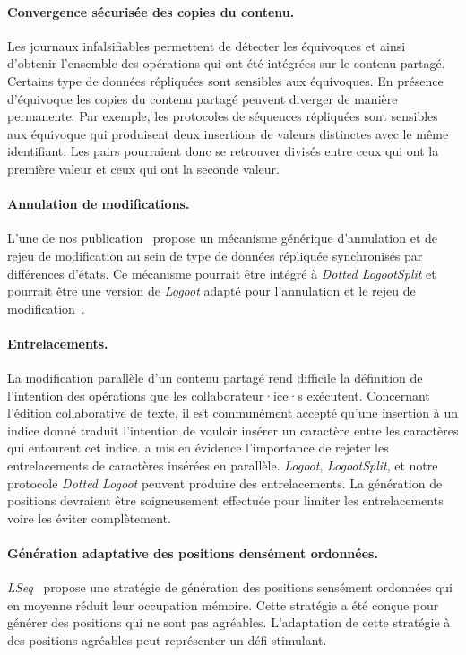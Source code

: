\paragraph{Convergence sécurisée des copies du contenu.} Les journaux infalsifiables permettent de détecter les équivoques et ainsi d'obtenir l'ensemble des opérations qui ont été intégrées sur le contenu partagé.
Certains type de données répliquées sont sensibles aux équivoques.
En présence d'équivoque les copies du contenu partagé peuvent diverger de manière permanente.
Par exemple, les protocoles de séquences répliquées sont sensibles aux équivoque qui produisent deux insertions de valeurs distinctes avec le même identifiant.
Les pairs pourraient donc se retrouver divisés entre ceux qui ont la première valeur et ceux qui ont la seconde valeur.

\paragraph{Annulation de modifications.} L'une de nos publication~\autocite{2019_yu_genericundo} propose un mécanisme générique d'annulation et de rejeu de modification au sein de type de données répliquée synchronisés par différences d'états.
Ce mécanisme pourrait être intégré à \emph{Dotted LogootSplit} et pourrait être une version de \emph{Logoot} adapté pour l'annulation et le rejeu de modification~\autocite{weiss2010logoot}.

\paragraph{Entrelacements.} La modification parallèle d'un contenu partagé rend difficile la définition de l'intention des opérations que les collaborateur·ice·s exécutent.
Concernant l'édition collaborative de texte, il est communément accepté qu'une insertion à un indice donné traduit l'intention de vouloir insérer un caractère entre les caractères qui entourent cet indice.
\textcite{kleppmann2019_interleaving} a mis en évidence l'importance de rejeter les entrelacements de caractères insérées en parallèle.
\emph{Logoot}, \emph{LogootSplit}, et notre protocole \emph{Dotted Logoot} peuvent produire des entrelacements.
La génération de positions devraient être soigneusement effectuée pour limiter les entrelacements voire les éviter complètement.

\paragraph{Génération adaptative des positions densément ordonnées.} \emph{LSeq}~\autocite{nedelec_2013_lseq} propose une stratégie de génération des positions sensément ordonnées qui en moyenne réduit leur occupation mémoire.
Cette stratégie a été conçue pour générer des positions qui ne sont pas agréables.
L'adaptation de cette stratégie à des positions agréables peut représenter un défi stimulant.


